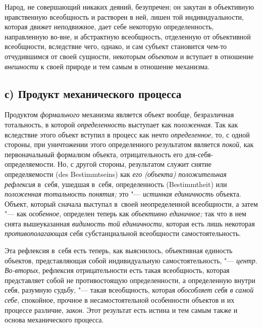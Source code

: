 Народ, не совершающий никаких деяний, безупречен; он закутан
в объективную нравственную всеобщность и растворен в ней, лишен той
индивидуальности, которая движет неподвижное, дает себе некоторую
определенность, направленную во-вне, и абстрактную всеобщность, отделенную
от объективной всеобщности, вследствие чего, однако, и сам субъект
становится чем-то отчудившимся от своей сущности, некоторым
{\em объектом} и вступает
в отношение {\em внешности}
к своей природе и тем самым в отношение механизма.

\subsection[с) Продукт механического процесса]{с) Продукт механического процесса}
Продуктом
{\em формального}
механизма является объект вообще, безразличная тотальность, в
которой {\em определенность}
выступает как
{\em положенная}. Так как
вследствие этого объект вступил в процесс как нечто
{\em определенное}, то, с
одной стороны, при уничтожении этого определенного результатом является
{\em покой}, как
первоначальный формализм объекта, отрицательность его
для-себя-определяемости. Но, с другой стороны,
результатом служит
снятие
определяемости (des Bestimmt\-seins) как
{\em его (объекта) положительная
рефлексия} в~себя, ушедшая в~себя, определенность
(Bestimmt\-heit) или {\em положенная
тотальность понятия;} это
"--- {\em истинная единичность
}объекта. Объект, который сначала выступал в~своей
неопределенной всеобщности, а затем "--- как
{\em особенное},
определен теперь как
{\em объективно единичное;}
так что в нем снята вышеуказанная
{\em видимость той единичности},
которая есть лишь некоторая
{\em противополагающая}
себя субстанциальной всеобщности самостоятельность.

Эта рефлексия в~себя есть теперь, как выяснилось, объективная
единость объектов, представляющая собой индивидуальную самостоятельность,
"--- {\em центр}.
{\em Во-вторых},
рефлексия отрицательности есть такая всеобщность, которая
представляет собой не противостоящую определенности, а определенную внутри
себя, разумную судьбу, "--- такая всеобщность, которая
{\em обособляет себя в
}{\em самой себе},
спокойное, прочное в несамостоятельной особенности объектов и
их процессе различие, {\em закон}.
Этот результат есть истина и тем самым также и основа
механического процесса.

